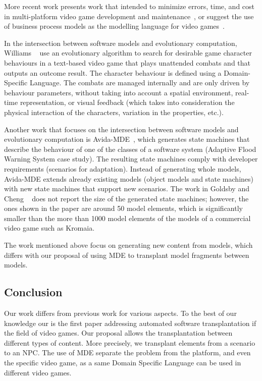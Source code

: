 More recent work presents work that intended to minimize errors, time, and cost in multi-platform video game development and maintenance~\cite{Nunez17,Nunez13,Usman17}, or suggest the use of business process models as the modelling language for video games~\cite{Solis15}.

In the intersection between software models and evolutionary computation, Williams \etal~\cite{Williams11} use an evolutionary algorithm to search for desirable game character behaviours in a text-based video game that plays unattended combats and that outputs an outcome result. The character behaviour is defined using a Domain-Specific Language. The combats are managed internally and are only driven by behaviour parameters, without taking into account a spatial environment, real-time representation, or visual feedback (which takes into consideration the physical interaction of the characters, variation in the properties, etc.).

Another work that focuses on the intersection between software models and evolutionary computation is Avida-MDE~\cite{Goldsby2008}, which generates state machines that describe the behaviour of one of the classes of a software system (Adaptive Flood Warning System case study). The resulting state machines comply with developer requirements (scenarios for
adaptation). Instead of generating whole models, Avida-MDE extends already existing models (object models and state machines) with new state machines that support new scenarios. The work in Goldsby and Cheng \etal~\cite{Goldsby2008} does not report the size of the generated state machines; however, the ones shown in the paper are around 50 model elements, which is significantly smaller than the more than 1000 model elements of the models of a commercial video game such as Kromaia.

The work mentioned above focus on generating new content from models, which differs with our proposal of using MDE to transplant model fragments between models.

\subsection{Conclusion}

Our work differs from previous work for various aspects. 
To the best of our knowledge our is the first paper addressing automated software transplantation if the field of video games. Our proposal allows the transplantation between different types of content. More precisely, we transplant elements from a scenario to an NPC. The use of MDE separate the problem from the platform, and even the specific video game, as a same Domain Specific Language can be used in different video games.